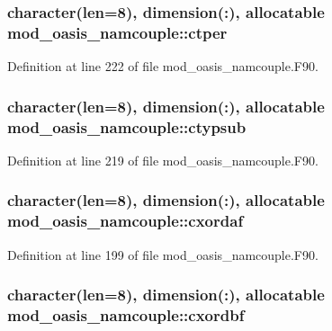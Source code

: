 \hypertarget{classmod__oasis__namcouple_aa179b0a473551b48ef895497515d021c}{
\subsubsection[{ctper}]{\setlength{\rightskip}{0pt plus 5cm}character(len=8), dimension(\+:), allocatable mod\+\_\+oasis\+\_\+namcouple\+::ctper\hspace{0.3cm}{\ttfamily [private]}}}\label{classmod__oasis__namcouple_aa179b0a473551b48ef895497515d021c}


Definition at line 222 of file mod\+\_\+oasis\+\_\+namcouple.\+F90.

\hypertarget{classmod__oasis__namcouple_ad8f8aca3a6fa885e4edf027b79a93305}{
\subsubsection[{ctypsub}]{\setlength{\rightskip}{0pt plus 5cm}character(len=8), dimension(\+:), allocatable mod\+\_\+oasis\+\_\+namcouple\+::ctypsub\hspace{0.3cm}{\ttfamily [private]}}}\label{classmod__oasis__namcouple_ad8f8aca3a6fa885e4edf027b79a93305}


Definition at line 219 of file mod\+\_\+oasis\+\_\+namcouple.\+F90.

\hypertarget{classmod__oasis__namcouple_ab52bc27bf5898cc85dce0fc60feb9320}{
\subsubsection[{cxordaf}]{\setlength{\rightskip}{0pt plus 5cm}character(len=8), dimension(\+:), allocatable mod\+\_\+oasis\+\_\+namcouple\+::cxordaf\hspace{0.3cm}{\ttfamily [private]}}}\label{classmod__oasis__namcouple_ab52bc27bf5898cc85dce0fc60feb9320}


Definition at line 199 of file mod\+\_\+oasis\+\_\+namcouple.\+F90.

\hypertarget{classmod__oasis__namcouple_a2ee5f8ec71ebae64c3d14445345d7545}{
\subsubsection[{cxordbf}]{\setlength{\rightskip}{0pt plus 5cm}character(len=8), dimension(\+:), allocatable mod\+\_\+oasis\+\_\+namcouple\+::cxordbf\hspace{0.3cm}{\ttfamily [private]}}}\label{classmod__oasis__namcouple_a2ee5f8ec71ebae64c3d14445345d7545}


